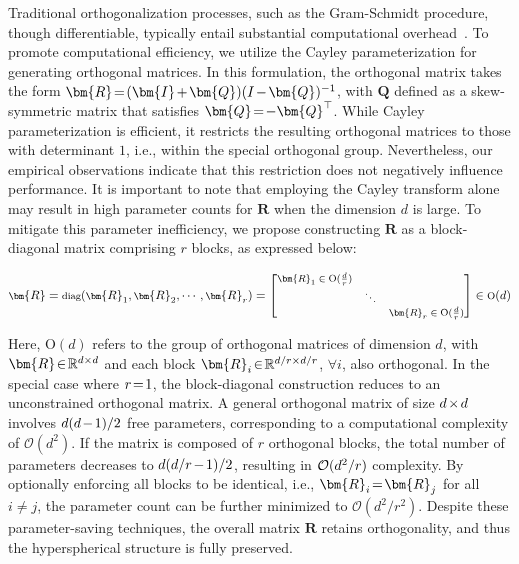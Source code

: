 {Traditional orthogonalization processes, such as the Gram-Schmidt procedure, though differentiable, typically entail substantial computational overhead~\cite{liu2021orthogonal}. To promote computational efficiency, we utilize the Cayley parameterization for generating orthogonal matrices. In this formulation, the orthogonal matrix takes the form $\thickmuskip=2mu \medmuskip=2mu \bm{R} = (\bm{I} + \bm{Q})(I - \bm{Q})^{-1}$, with $\bm{Q}$ defined as a skew-symmetric matrix that satisfies $\thickmuskip=2mu \medmuskip=2mu \bm{Q} = -\bm{Q}^\top$. While Cayley parameterization is efficient, it restricts the resulting orthogonal matrices to those with determinant $1$, i.e., within the special orthogonal group. Nevertheless, our empirical observations indicate that this restriction does not negatively influence performance. It is important to note that employing the Cayley transform alone may result in high parameter counts for $\bm{R}$ when the dimension $d$ is large. To mitigate this parameter inefficiency, we propose constructing $\bm{R}$ as a block-diagonal matrix comprising $r$ blocks, as expressed below:

\begin{equation}
    \footnotesize
    \bm{R} = \text{diag}(\bm{R}_1, \bm{R}_2, \cdots, \bm{R}_r) = \begin{bmatrix}
    \bm{R}_1 \in \text{O}(\frac{d}{r}) & & \\
    & \ddots & \\
    & & \bm{R}_r \in \text{O}(\frac{d}{r})
    \end{bmatrix} \in \text{O}(d)
\end{equation}

Here, $\text{O}(d)$ refers to the group of orthogonal matrices of dimension $d$, with $\thickmuskip=2mu \medmuskip=2mu \bm{R}\in\mathbb{R}^{d\times d}$ and each block $\thickmuskip=2mu \medmuskip=2mu \bm{R}_i\in\mathbb{R}^{d/r\times d/r}$, $\forall i$, also orthogonal. In the special case where $\thickmuskip=2mu \medmuskip=2mu r=1$, the block-diagonal construction reduces to an unconstrained orthogonal matrix. A general orthogonal matrix of size $\thickmuskip=2mu \medmuskip=2mu d\times d$ involves $\thickmuskip=2mu \medmuskip=2mu d(d-1)/2$ free parameters, corresponding to a computational complexity of $\mathcal{O}(d^2)$. If the matrix is composed of $r$ orthogonal blocks, the total number of parameters decreases to $\thickmuskip=2mu \medmuskip=2mu d(d/r-1)/2$, resulting in $\thickmuskip=2mu \medmuskip=2mu \mathcal{O}(d^2/r)$ complexity. By optionally enforcing all blocks to be identical, i.e., $\thickmuskip=2mu \medmuskip=2mu\bm{R}_i=\bm{R}_j$ for all $i\neq j$, the parameter count can be further minimized to $\mathcal{O}(d^2/r^2)$. Despite these parameter-saving techniques, the overall matrix $\bm{R}$ retains orthogonality, and thus the hyperspherical structure is fully preserved.

}
